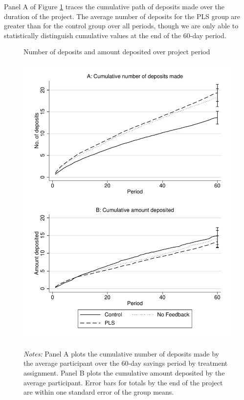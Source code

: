 \documentclass[11pt]{article}
\begin{document}
		

		Panel A of Figure \ref{fig:line-cumdeposits} traces the cumulative path of deposits made over the duration of the project. The average number of deposits for the PLS group are greater than for the control group over all periods, though we are only able to statistically distinguish cumulative values at the end of the 60-day period.

		\begin{figure}[ht]
			\caption{Number of deposits and amount deposited over project period}
			\includegraphics[height=0.85\textheight]{../../figures/line-cumdeposits.pdf}
			\label{fig:line-cumdeposits}
			\caption*{\footnotesize \emph{Notes:} Panel A plots the cumulative number of deposits made by the average participant over the 60-day savings period by treatment assignment. Panel B plots the cumulative amount deposited by the average participant. Error bars for totals by the end of the project are within one standard error of the group means.}
		\end{figure}
\end{document}
